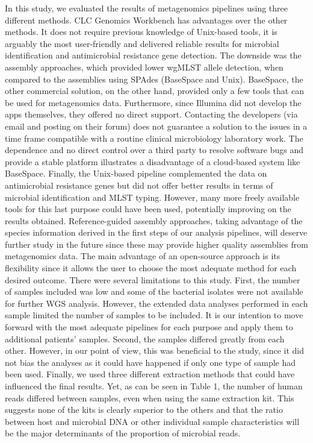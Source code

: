 In this study, we evaluated the results of metagenomics pipelines using three different methods. CLC Genomics Workbench has advantages over the other methods. It does not require previous knowledge of Unix-based tools, it is arguably the most user-friendly and delivered reliable results for microbial identification and antimicrobial resistance gene detection. The downside was the assembly approaches, which provided lower wgMLST allele detection, when compared to the assemblies using SPAdes (BaseSpace and Unix). BaseSpace, the other commercial solution, on the other hand, provided only a few tools that can be used for metagenomics data. Furthermore, since Illumina did not develop the apps themselves, they offered no direct support. Contacting the developers (via email and posting on their forum) does not guarantee a solution to the issues in a time frame compatible with a routine clinical microbiology laboratory work. The dependence and no direct control over a third party to resolve software bugs and provide a stable platform illustrates a disadvantage of a cloud-based system like BaseSpace. Finally, the Unix-based pipeline complemented the data on antimicrobial resistance genes but did not offer better results in terms of microbial identification and MLST typing. However, many more freely available tools for this last purpose could have been used, potentially improving on the results obtained. Reference-guided assembly approaches, taking advantage of the species information derived in the first steps of our analysis pipelines, will deserve further study in the future since these may provide higher quality assemblies from metagenomics data. The main advantage of an open-source approach is its flexibility since it allows the user to choose the most adequate method for each desired outcome.
There were several limitations to this study. First, the number of samples included was low and some of the bacterial isolates were not available for further WGS analysis. However, the extended data analyses performed in each sample limited the number of samples to be included. It is our intention to move forward with the most adequate pipelines for each purpose and apply them to additional patients’ samples. Second, the samples differed greatly from each other. However, in our point of view, this was beneficial to the study, since it did not bias the analyses as it could have happened if only one type of sample had been used. Finally, we used three different extraction methods that could have influenced the final results. Yet, as can be seen in Table 1, the number of human reads differed between samples, even when using the same extraction kit. This suggests none of the kits is clearly superior to the others and that the ratio between host and microbial DNA or other individual sample characteristics will be the major determinants of the proportion of microbial reads.

